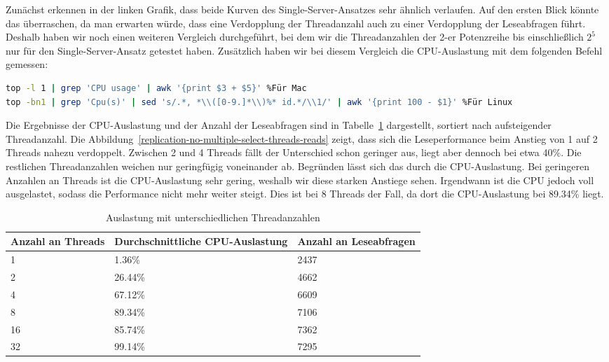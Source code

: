 Zunächst erkennen in der linken Grafik, dass beide Kurven des Single-Server-Ansatzes sehr ähnlich verlaufen.
Auf den ersten Blick könnte das überraschen, da man erwarten würde, dass eine Verdopplung der Threadanzahl auch zu einer Verdopplung der Leseabfragen führt.
Deshalb haben wir noch einen weiteren Vergleich durchgeführt, bei dem wir die Threadanzahlen der 2-er Potenzreihe bis einschließlich $2^5$ nur für den Single-Server-Ansatz getestet haben.
Zusätzlich haben wir bei diesem Vergleich die CPU-Auslastung mit dem folgenden Befehl gemessen:

\vspace{-5pt}
\begin{lstlisting}[language=bash,caption=Messen der CPU-Auslastung,label={lst:replication-cpu-usage},style=custom_daniel,basicstyle=\ttfamily\scriptsize]
top -l 1 | grep 'CPU usage' | awk '{print $3 + $5}' %Für Mac
top -bn1 | grep 'Cpu(s)' | sed 's/.*, *\\([0-9.]*\\)%* id.*/\\1/' | awk '{print 100 - $1}' %Für Linux
\end{lstlisting}
\vspace{-5pt}

Die Ergebnisse der CPU-Auslastung und der Anzahl der Leseabfragen sind in Tabelle~\ref{tab:replication-multiple-select-threads} dargestellt, sortiert nach aufsteigender Threadanzahl.
Die Abbildung~\ref{replication-no-multiple-select-threads-reads} zeigt, dass sich die Leseperformance beim Anstieg von 1 auf 2 Threads nahezu verdoppelt.
Zwischen 2 und 4 Threads fällt der Unterschied schon geringer aus, liegt aber dennoch bei etwa 40\%.
Die restlichen Threadanzahlen weichen nur geringfügig voneinander ab.
Begründen lässt sich das durch die CPU-Auslastung.
Bei geringeren Anzahlen an Threads ist die CPU-Auslastung sehr gering, weshalb wir diese starken Anstiege sehen.
Irgendwann ist die CPU jedoch voll ausgelastet, sodass die Performance nicht mehr weiter steigt.
Dies ist bei 8 Threads der Fall, da dort die CPU-Auslastung bei 89.34\% liegt.

\vspace{-2pt}
\begin{table}[H]
  \centering
  \scriptsize
  \begin{tabular}{|l|l|l|}
    \hline
    \textbf{Anzahl an Threads} & \textbf{Durchschnittliche CPU-Auslastung} & \textbf{Anzahl an Leseabfragen} \\
    \hline
    1 & 1.36\% & 2437 \\
    2 & 26.44\% & 4662 \\
    4 & 67.12\% & 6609 \\
    8 & 89.34\% & 7106 \\
    16 & 85.74\% & 7362 \\
    32 & 99.14\% & 7295 \\
    \hline
  \end{tabular}
  \vspace{3pt}
  \caption{Auslastung mit unterschiedlichen Threadanzahlen}
  \label{tab:replication-multiple-select-threads}
\end{table}
\vspace{-25pt}

